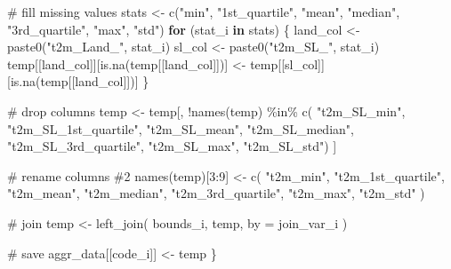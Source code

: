 \documentclass[
  letterpaper,
  DIV=11,
  numbers=noendperiod]{scrartcl}
\newenvironment{Shaded}{\begin{snugshade}}{\end{snugshade}}
\newcommand{\AttributeTok}[1]{\textcolor[rgb]{0.40,0.45,0.13}{#1}}
\newcommand{\CommentTok}[1]{\textcolor[rgb]{0.37,0.37,0.37}{#1}}
\newcommand{\ControlFlowTok}[1]{\textcolor[rgb]{0.00,0.23,0.31}{\textbf{#1}}}
\newcommand{\DecValTok}[1]{\textcolor[rgb]{0.68,0.00,0.00}{#1}}
\newcommand{\FunctionTok}[1]{\textcolor[rgb]{0.28,0.35,0.67}{#1}}
\newcommand{\NormalTok}[1]{\textcolor[rgb]{0.00,0.23,0.31}{#1}}
\newcommand{\OtherTok}[1]{\textcolor[rgb]{0.00,0.23,0.31}{#1}}
\newcommand{\SpecialCharTok}[1]{\textcolor[rgb]{0.37,0.37,0.37}{#1}}
\newcommand{\StringTok}[1]{\textcolor[rgb]{0.13,0.47,0.30}{#1}}
\begin{document}
\begin{Shaded}
\begin{Highlighting}[]
  \CommentTok{\# fill missing values}
\NormalTok{  stats }\OtherTok{\textless{}{-}} \FunctionTok{c}\NormalTok{(}\StringTok{"min"}\NormalTok{, }\StringTok{"1st\_quartile"}\NormalTok{, }\StringTok{"mean"}\NormalTok{, }\StringTok{"median"}\NormalTok{, }\StringTok{"3rd\_quartile"}\NormalTok{, }\StringTok{"max"}\NormalTok{, }\StringTok{"std"}\NormalTok{)}
  \ControlFlowTok{for}\NormalTok{ (stat\_i }\ControlFlowTok{in}\NormalTok{ stats) \{}
\NormalTok{    land\_col }\OtherTok{\textless{}{-}} \FunctionTok{paste0}\NormalTok{(}\StringTok{"t2m\_Land\_"}\NormalTok{, stat\_i)}
\NormalTok{    sl\_col }\OtherTok{\textless{}{-}} \FunctionTok{paste0}\NormalTok{(}\StringTok{"t2m\_SL\_"}\NormalTok{, stat\_i)}
\NormalTok{    temp[[land\_col]][}\FunctionTok{is.na}\NormalTok{(temp[[land\_col]])] }\OtherTok{\textless{}{-}}\NormalTok{ temp[[sl\_col]][}\FunctionTok{is.na}\NormalTok{(temp[[land\_col]])]}
\NormalTok{  \}}
  
  \CommentTok{\# drop columns}
\NormalTok{  temp }\OtherTok{\textless{}{-}}\NormalTok{ temp[, }\SpecialCharTok{!}\FunctionTok{names}\NormalTok{(temp) }\SpecialCharTok{\%in\%} \FunctionTok{c}\NormalTok{(}
    \StringTok{"t2m\_SL\_min"}\NormalTok{, }\StringTok{"t2m\_SL\_1st\_quartile"}\NormalTok{, }\StringTok{"t2m\_SL\_mean"}\NormalTok{, }\StringTok{"t2m\_SL\_median"}\NormalTok{,}
    \StringTok{"t2m\_SL\_3rd\_quartile"}\NormalTok{, }\StringTok{"t2m\_SL\_max"}\NormalTok{, }\StringTok{"t2m\_SL\_std"}\NormalTok{)}
\NormalTok{  ]}
  
  \CommentTok{\# rename columns \#2}
  \FunctionTok{names}\NormalTok{(temp)[}\DecValTok{3}\SpecialCharTok{:}\DecValTok{9}\NormalTok{] }\OtherTok{\textless{}{-}} \FunctionTok{c}\NormalTok{(}
    \StringTok{"t2m\_min"}\NormalTok{,}
    \StringTok{"t2m\_1st\_quartile"}\NormalTok{,}
    \StringTok{"t2m\_mean"}\NormalTok{,}
    \StringTok{"t2m\_median"}\NormalTok{,}
    \StringTok{"t2m\_3rd\_quartile"}\NormalTok{,}
    \StringTok{"t2m\_max"}\NormalTok{,}
    \StringTok{"t2m\_std"}
\NormalTok{  )}
  
  \CommentTok{\# join}
\NormalTok{  temp }\OtherTok{\textless{}{-}} \FunctionTok{left\_join}\NormalTok{(}
\NormalTok{    bounds\_i,}
\NormalTok{    temp,}
    \AttributeTok{by =}\NormalTok{ join\_var\_i}
\NormalTok{  )}
  
  \CommentTok{\# save}
\NormalTok{  aggr\_data[[code\_i]] }\OtherTok{\textless{}{-}}\NormalTok{ temp}
\NormalTok{\}}
\end{Highlighting}
\end{Shaded}
\end{document}
